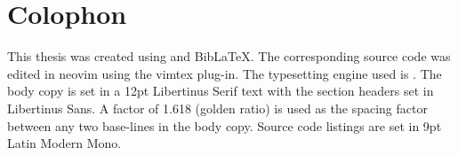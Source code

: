
\chapter{Colophon}

This thesis was created using \LaTeXe and Bib\LaTeX{}. The corresponding source
code was edited in neovim using the vimtex plug-in. The typesetting engine used
is . The body copy is set in a
12pt Libertinus Serif text with the section headers set in Libertinus Sans. A
factor of 1.618 (golden ratio) is used as the spacing factor between any two
base-lines in the body copy. Source code listings are set in 9pt Latin Modern
Mono.
